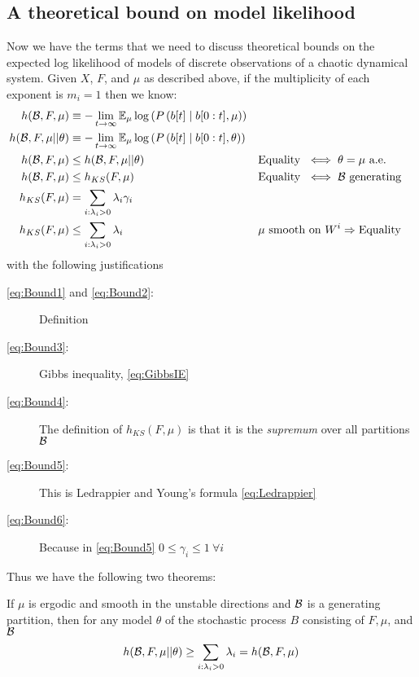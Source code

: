 \subsection{A theoretical bound on model likelihood}
\label{sec:TheoreticalBound}

Now we have the terms that we need to discuss theoretical bounds on
the expected log likelihood of models of discrete observations of a
chaotic dynamical system.  Given $X$, $F$, and $\mu$ as described
above, if the multiplicity of each exponent is $m_i = 1$ then we know:
\begin{align}
  \label{eq:Bound1}
  h({\cal{B}},F,\mu) &\equiv - \lim_{t \rightarrow
    \infty} \EV_\mu \log \left( P \left( \ti{b}{t}\given \ts{b}{0}{t}, \mu
    \right) \right) \\
  \label{eq:Bound2}
  h({\cal{B}},F,\mu||\theta) &\equiv - \lim_{t \rightarrow \infty}
  \EV_\mu \log \left( P \left( \ti{b}{t}\given \ts{b}{0}{t}, \theta
    \right) \right) \\
  \label{eq:Bound3}
  h({\cal{B}},F,\mu) &\leq h({\cal{B}},F,\mu||\theta)  &&
  \text{Equality } \iff \theta = \mu \text{ a.e.}\\
  \label{eq:Bound4}
  h({\cal{B}},F,\mu) &\leq h_{KS}(F,\mu)  &&
  \text{Equality } \iff {\cal{B}} \text{ generating} \\
  \label{eq:Bound5}
  h_{KS}(F,\mu) &= \sum_{i : \lambda_i > 0} \lambda_i \gamma_i\\
  \label{eq:Bound6}
  h_{KS}(F,\mu) &\leq \sum_{i : \lambda_i > 0} \lambda_i && \mu \text{
  smooth on } W^i \Rightarrow \text{Equality}
\end{align}
with the following justifications
\begin{description}
\item[\eqref{eq:Bound1} {\mdseries and} \eqref{eq:Bound2}:] Definition
\item[\eqref{eq:Bound3}:] Gibbs inequality, \eqref{eq:GibbsIE}
\item[\eqref{eq:Bound4}:] The definition of $h_{KS}(F,\mu)$ is that it is the
  \emph{supremum} over all partitions ${\cal{B}}$
\item[\eqref{eq:Bound5}:] This is Ledrappier and Young's formula
  \eqref{eq:Ledrappier}
\item[\eqref{eq:Bound6}:] Because in \eqref{eq:Bound5} $0 \leq \gamma_i \leq
  1~ \forall i$
\end{description}
Thus we have the following two theorems:
\begin{theorem}
  If $\mu$ is ergodic and smooth in the unstable directions and
  $\cal{B}$ is a generating partition, then for any model $\theta$ of
  the stochastic process $B$ consisting of $F,\mu$, and $\cal{B}$
  \begin{equation}
    \label{eq:BoundTheorem}
    h({\cal{B}},F,\mu||\theta) \geq \sum_{i : \lambda_i > 0} \lambda_i
= h({\cal{B}},F,\mu)
  \end{equation}
\end{theorem}
